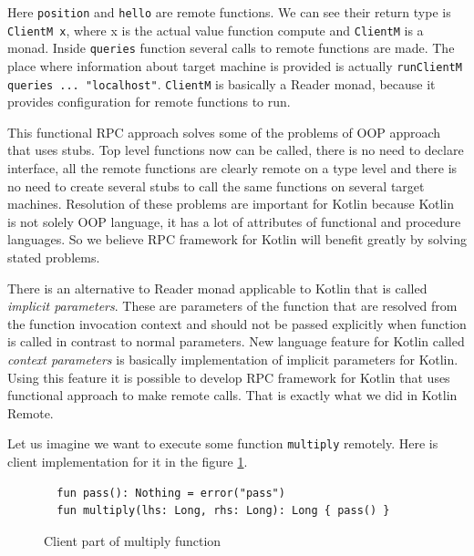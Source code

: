 \documentclass[a4paper,11pt,oneside]{article}
\newcommand{\term}[1]{\textit{#1}}
\newcommand{\kotlini}[1]{\texttt{#1}}
\begin{document}
Here \texttt{position} and \texttt{hello} are remote functions. We can see
their return type is \texttt{ClientM x}, where x is the actual value function compute and
\texttt{ClientM} is a monad. Inside \texttt{queries} function several calls
to remote functions are made. The place where information about target machine is provided is actually
\texttt{runClientM queries ... "localhost"}. \texttt{ClientM} is basically
a Reader monad, because it provides configuration for remote functions to run.

This functional RPC approach solves some of the problems of OOP approach that uses stubs. Top level 
functions now can be called, there is no need to declare interface, all the remote functions are
clearly remote on a type level and there is no need to create several stubs to call the same
functions on several target machines. Resolution of these problems are important for Kotlin because
Kotlin is not solely OOP language, it has a lot of attributes of functional and procedure
languages. So we believe RPC framework for Kotlin will benefit greatly by solving stated problems.

There is an alternative to Reader monad applicable to Kotlin that is called \term{implicit parameters}.
These are parameters of the function that are resolved from the function invocation context and
should not be passed explicitly when function is called in contrast to normal parameters. New
language feature for Kotlin called \term{context parameters}
\cite{noauthor_keepproposalskeep-0367-context-parametersmd_nodate} is basically implementation of
implicit parameters for Kotlin. Using this feature it is possible to develop RPC framework for
Kotlin that uses functional approach to make remote calls. That is exactly what we did in Kotlin
Remote.

Let us imagine we want to execute some function \kotlini{multiply} remotely. Here is client implementation
for it in the figure \ref{multiply_client}.

\begin{figure}[!h]
  \begin{verbatim}
  fun pass(): Nothing = error("pass")
  fun multiply(lhs: Long, rhs: Long): Long { pass() }
  \end{verbatim}
  \caption{Client part of multiply function}\label{multiply_client}
\end{figure}
\end{document}
